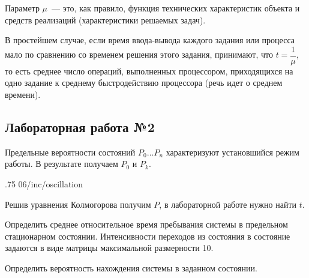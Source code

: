 Параметр $\mu$~--- это, как правило, функция технических характеристик объекта и средств реализаций (характеристики решаемых задач).

В простейшем случае, если время ввода-вывода каждого задания или процесса мало по сравнению со временем решения этого задания, принимают, что ${t = \dfrac{1}{\mu}}$, то есть среднее число операций, выполненных процессором, приходящихся на одно задание к среднему быстродействию процессора (речь идет о среднем времени).

\subsection{Лабораторная работа №2}

Предельные вероятности состояний $P_0\dots P_n$ характеризуют установшийся режим работы. В результате получаем $P_0$ и $P_k$.

\image
{.75\textwidth}
{06/inc/oscillation}
{}

Решив уравнения Колмогорова получим $P$, в лабораторной работе нужно найти $t$.

Определить среднее относительное время пребывания системы в предельном стационарном состоянии. Интенсивности переходов из состояния в состояние задаются в виде матрицы максимальной размерности 10.

Определить вероятность нахождения системы в заданном состоянии.